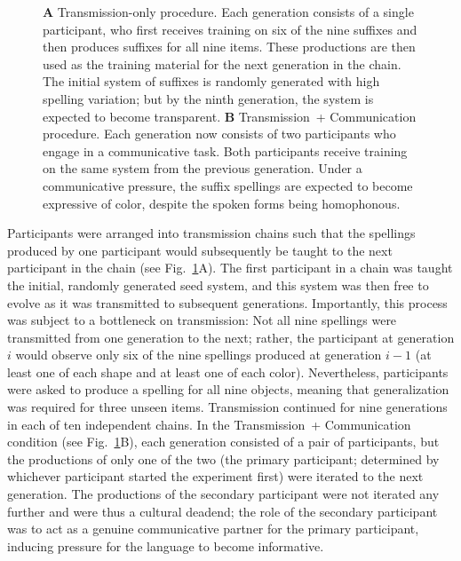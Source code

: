 \documentclass[doc,biblatex]{apa7}
\begin{document}
	\begin{figure}
	\vspace*{2pt}
	\caption{\textbf{A} Transmission-only procedure. Each generation consists of a single participant, who first receives training on six of the nine suffixes and then produces suffixes for all nine items. These productions are then used as the training material for the next generation in the chain. The initial system of suffixes is randomly generated with high spelling variation; but by the ninth generation, the system is expected to become transparent. \textbf{B} Transmission~+ Communication procedure. Each generation now consists of two participants who engage in a communicative task. Both participants receive training on the same system from the previous generation. Under a communicative pressure, the suffix spellings are expected to become expressive of color, despite the spoken forms being homophonous.}
	\label{transmission}
	\end{figure}

Participants were arranged into transmission chains such that the spellings produced by one participant would subsequently be taught to the next participant in the chain (see Fig.~\ref{transmission}A). The first participant in a chain was taught the initial, randomly generated seed system, and this system was then free to evolve as it was transmitted to subsequent generations. Importantly, this process was subject to a bottleneck on transmission: Not all nine spellings were transmitted from one generation to the next; rather, the participant at generation $i$ would observe only six of the nine spellings produced at generation $i-1$ (at least one of each shape and at least one of each color). Nevertheless, participants were asked to produce a spelling for all nine objects, meaning that generalization was required for three unseen items. Transmission continued for nine generations in each of ten independent chains. In the Transmission~+ Communication condition (see Fig.~\ref{transmission}B), each generation consisted of a pair of participants, but the productions of only one of the two (the primary participant; determined by whichever participant started the experiment first) were iterated to the next generation. The productions of the secondary participant were not iterated any further and were thus a cultural deadend; the role of the secondary participant was to act as a genuine communicative partner for the primary participant, inducing pressure for the language to become informative.
\end{document}
